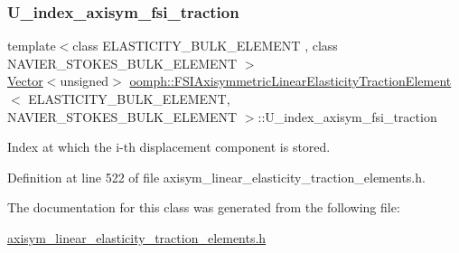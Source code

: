 \subsubsection{\texorpdfstring{U\+\_\+index\+\_\+axisym\+\_\+fsi\+\_\+traction}{U\_index\_axisym\_fsi\_traction}}
{\footnotesize\ttfamily template$<$class E\+L\+A\+S\+T\+I\+C\+I\+T\+Y\+\_\+\+B\+U\+L\+K\+\_\+\+E\+L\+E\+M\+E\+NT , class N\+A\+V\+I\+E\+R\+\_\+\+S\+T\+O\+K\+E\+S\+\_\+\+B\+U\+L\+K\+\_\+\+E\+L\+E\+M\+E\+NT $>$ \\
\hyperlink{classoomph_1_1Vector}{Vector}$<$unsigned$>$ \hyperlink{classoomph_1_1FSIAxisymmetricLinearElasticityTractionElement}{oomph\+::\+F\+S\+I\+Axisymmetric\+Linear\+Elasticity\+Traction\+Element}$<$ E\+L\+A\+S\+T\+I\+C\+I\+T\+Y\+\_\+\+B\+U\+L\+K\+\_\+\+E\+L\+E\+M\+E\+NT, N\+A\+V\+I\+E\+R\+\_\+\+S\+T\+O\+K\+E\+S\+\_\+\+B\+U\+L\+K\+\_\+\+E\+L\+E\+M\+E\+NT $>$\+::U\+\_\+index\+\_\+axisym\+\_\+fsi\+\_\+traction\hspace{0.3cm}{\ttfamily [protected]}}



Index at which the i-\/th displacement component is stored. 



Definition at line 522 of file axisym\+\_\+linear\+\_\+elasticity\+\_\+traction\+\_\+elements.\+h.



The documentation for this class was generated from the following file\+:\begin{DoxyCompactItemize}
\item 
\hyperlink{axisym__linear__elasticity__traction__elements_8h}{axisym\+\_\+linear\+\_\+elasticity\+\_\+traction\+\_\+elements.\+h}\end{DoxyCompactItemize}
